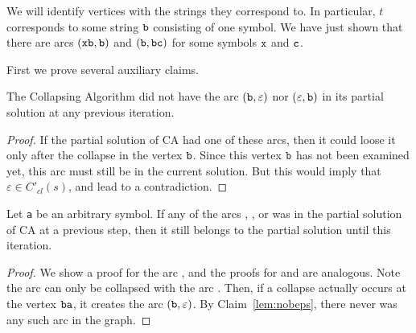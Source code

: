 We will identify vertices with the strings they correspond to. In particular, $ t $ corresponds to some string $ \tt b $ consisting of one symbol. We have just shown that there are arcs $ ({\tt xb}, {\tt b}) $ and $ ({\tt b}, {\tt bc}) $ for some symbols $ {\tt x} $ and $ {\tt c} $.

First we prove several auxiliary claims.

\begin{claim}
\label{lem:nobeps}
The Collapsing Algorithm did not have the arc $ ({\tt b}, \varepsilon) $ nor $ (\varepsilon, {\tt b}) $ in its partial solution at any previous iteration.
\end{claim}
\begin{proof}
If the partial solution of CA had one of these arcs, then it could loose it only after the collapse in the vertex $ {\tt b} $. Since this vertex $ {\tt b} $ has not been examined yet, this arc must still be in the current solution. But this would imply that $ \varepsilon \in C'_{cl} (s) $, and lead to a contradiction.
\end{proof}

\begin{claim}
\label{lem:bccsave}
Let {\tt a} be an arbitrary symbol. If any of the arcs , , or  was in the partial solution of CA at a previous step, then it still belongs to the partial solution until this iteration.
\end{claim}
\begin{proof}
We show a proof for the arc , and the proofs for  and  are analogous.  Note the arc  can only be collapsed with the arc . Then, if a collapse actually occurs at the vertex $ {\tt ba} $, it creates the arc $ ({\tt b}, \varepsilon) $. By Claim~\ref{lem:nobeps}, there never was any such arc in the graph. \end{proof}

